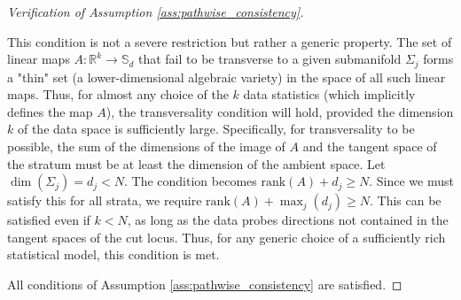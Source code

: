 \documentclass[12pt, letterpaper]{amsart}
\newcommand{\Sd}{\mathbb{S}_d}
\newcommand{\R}{\mathbb{R}}
\theoremstyle{plain}
\theoremstyle{definition}
\theoremstyle{remark}
\numberwithin{equation}{section} %
\begin{document}
\begin{proof}[Verification of Assumption \ref{ass:pathwise_consistency}]
\begin{enumerate}[label=(\roman*)]
    This condition is not a severe restriction but rather a generic property. The set of linear maps $A: \R^k \to \Sd$ that fail to be transverse to a given submanifold $\Sigma_j$ forms a "thin" set (a lower-dimensional algebraic variety) in the space of all such linear maps. Thus, for almost any choice of the $k$ data statistics (which implicitly defines the map $A$), the transversality condition will hold, provided the dimension $k$ of the data space is sufficiently large. Specifically, for transversality to be possible, the sum of the dimensions of the image of $A$ and the tangent space of the stratum must be at least the dimension of the ambient space. Let $\dim(\Sigma_j) = d_j < N$. The condition becomes $\mathrm{rank}(A) + d_j \ge N$. Since we must satisfy this for all strata, we require $\mathrm{rank}(A) + \max_j(d_j) \ge N$. This can be satisfied even if $k < N$, as long as the data probes directions not contained in the tangent spaces of the cut locus. Thus, for any generic choice of a sufficiently rich statistical model, this condition is met.
\end{enumerate}
All conditions of Assumption \ref{ass:pathwise_consistency} are satisfied.
\end{proof}
\end{document}
